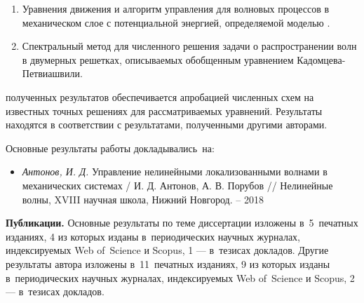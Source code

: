 {}
\begin{enumerate}[beginpenalty=10000] %
  \item {Уравнения движения и алгоритм управления для волновых процессов в механическом слое с потенциальной энергией, определяемой моделью \cite{bound_porsp17}.}
  \item {Спектральный метод для численного решения задачи о распространении волн в двумерных решетках, описываемых обобщенным уравнением Кадомцева-Петвиашвили.}
\end{enumerate}

{\reliability} полученных результатов обеспечивается апробацией численных схем на известных точных решениях для рассматриваемых уравнений. Результаты находятся в соответствии с результатами, полученными другими авторами.


{\probation}
Основные результаты работы докладывались~на:
\begin{itemize}
\item \textit{Антонов, И. Д.} Управление нелинейными локализованными волнами в
механических системах / И. Д. Антонов, А. В. Порубов // Нелинейные волны, XVIII научная школа, Нижний Новгород. -- 2018
\end{itemize}


\textbf{Публикации.} Основные результаты по теме диссертации изложены в~5~печатных изданиях, 4 из которых изданы в~периодических научных журналах, индексируемых Web of~Science и Scopus, 1 --- в~тезисах докладов. Другие результаты автора изложены в~11~печатных изданиях, 9 из которых изданы в~периодических научных журналах, индексируемых Web of~Science и Scopus, 2 --- в~тезисах докладов.

